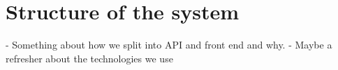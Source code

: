 \section{Structure of the system}
- Something about how we split into API and front end and why. 
- Maybe a refresher about the technologies we use